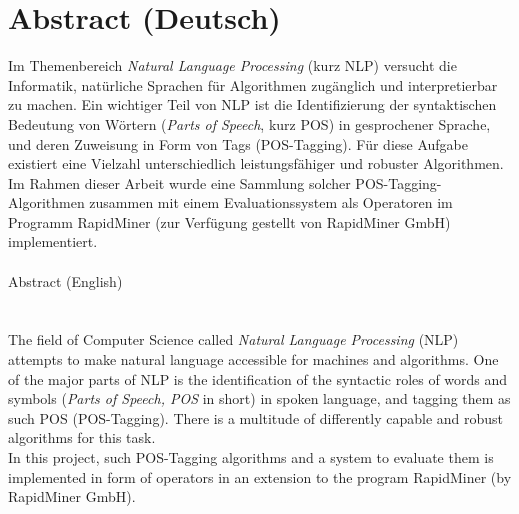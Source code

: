 %
\chapter*{Abstract (Deutsch)}
\label{sec:abstract}
\vspace*{-10mm}


Im Themenbereich \textit{Natural Language Processing} (kurz NLP) versucht die Informatik, natürliche Sprachen für Algorithmen zugänglich und interpretierbar zu machen. Ein wichtiger Teil von NLP ist die Identifizierung der syntaktischen Bedeutung von Wörtern (\textit{Parts of Speech}, kurz POS) in gesprochener Sprache, und deren Zuweisung in Form von Tags (POS-Tagging). Für diese Aufgabe existiert eine Vielzahl unterschiedlich leistungsfähiger und robuster Algorithmen.
\newline
Im Rahmen dieser Arbeit wurde eine Sammlung solcher POS-Tagging-Algorithmen zusammen mit einem Evaluationssystem als Operatoren im Programm RapidMiner (zur Verfügung gestellt von RapidMiner GmbH) implementiert.
\\\\


{Abstract (English)}\label{sec:abstract-diff} \\\\\\
The field of Computer Science called \textit{Natural Language Processing} (NLP) attempts to make natural language accessible for machines and algorithms. One of the major parts of NLP is the identification of the syntactic roles of words and symbols (\textit{Parts of Speech, POS} in short) in spoken language, and tagging them as such POS (POS-Tagging). There is a multitude of differently capable and robust algorithms for this task.
\\
In this project, such POS-Tagging algorithms and a system to evaluate them is implemented in form of operators in an extension to the program RapidMiner (by RapidMiner GmbH).
